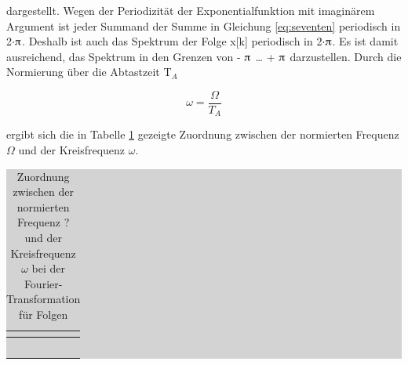 \noindent dargestellt. Wegen der Periodizit\"{a}t der Exponentialfunktion mit imagin\"{a}rem Argument ist jeder Summand der Summe in Gleichung \eqref{eq:seventen} periodisch in 2$\cdot\piup$. Deshalb ist auch das Spektrum der Folge x[k] periodisch in 2$\cdot\piup$. Es ist damit ausreichend, das Spektrum in den Grenzen von - $\piup$ {\dots} + $\piup$ darzustellen. Durch die Normierung \"{u}ber die Abtastzeit T${}_{A}$

\begin{equation}\label{eq:seventwelve}
\omega =\frac{\Omega}{T_{A}}
\end{equation}

\noindent ergibt sich die in Tabelle \ref{tab:sevenone} gezeigte Zuordnung zwischen der normierten Frequenz $\Omega$ und der Kreisfrequenz $\omega$.

\begin{table}[H]
\setlength{\arrayrulewidth}{.1em}
\caption{Zuordnung zwischen der normierten Frequenz ? und der Kreisfrequenz $\omega$ bei der Fourier-Transformation f\"{u}r Folgen}
\setlength{\fboxsep}{0pt}%
\colorbox{lightgray}{%
%
\begin{tabular}{| c | c |}
\hline
\parbox[c][0.35in][c]{3.3in}{\smallskip\centering\textbf{\selectfont{Normierte Kreisfrequenz $\Omega$}}} & 
\parbox[c][0.35in][c]{3.3in}{\smallskip\centering\textbf{\selectfont{Kreisfrequenz $\omega$}}}\\ \hline

\parbox[c][0.4in][c]{3.3in}{\centering{- $\pi$}} & 
\parbox[c][0.4in][c]{3.3in}{}\\ \hline

\parbox[c][0.4in][c]{3.3in}{} & 
\parbox[c][0.4in][c]{3.3in}{}\\ \hline

\parbox[c][0.4in][c]{3.3in}{} & 
\parbox[c][0.4in][c]{3.3in}{}\\ \hline

\parbox[c][0.4in][c]{3.3in}{} & 
\parbox[c][0.4in][c]{3.3in}{}\\ \hline

\parbox[c][0.4in][c]{3.3in}{\centering{$\pi$}} & 
\parbox[c][0.4in][c]{3.3in}{}\\ \hline

\end{tabular}%
}
\label{tab:sevenone}
\end{table}

